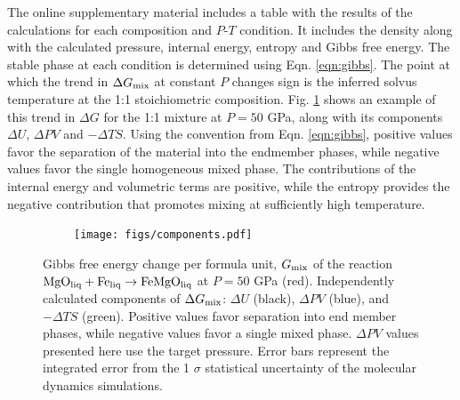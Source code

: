 The online supplementary material includes a table with the results of the calculations
for each composition and $P$-$T$ condition. It includes the density along with the
calculated pressure, internal energy, entropy and Gibbs free energy. The stable phase at
each condition is determined using Eqn. \ref{eqn:gibbs}.  The point at which the trend in
$\Delta G_{\rm mix}$ at constant $P$ changes sign is the inferred solvus temperature at
the 1:1 stoichiometric composition.  Fig.  \ref{fig:components} shows an example of this
trend in $\Delta G$ for the 1:1 mixture at $P=50$ GPa, along with its components $\Delta
U$, $\Delta PV$ and $-\Delta TS$. Using the convention from Eqn. \ref{eqn:gibbs},
positive values favor the separation of the  material into the endmember phases, while
negative values favor the single homogeneous mixed phase. The contributions of the
internal energy and volumetric terms are positive, while the entropy provides the
negative contribution that promotes mixing at sufficiently high temperature. 

\begin{figure}[h!]  
  \centering
    \texttt{[image: figs/components.pdf]}
\caption{Gibbs free energy change per formula unit, $G_{\rm{mix}}$ of the reaction
${ \rm MgO_{liq} + Fe_{liq} } \rightarrow {\rm FeMgO_{liq}}$ at $P=50$ GPa (red).  Independently
calculated components of $\Delta G_{\rm{mix}}$: $\Delta U$ (black), $\Delta PV$ (blue),
and $-\Delta TS$ (green). Positive values favor separation into end member phases,
while negative values favor a single mixed phase. $\Delta PV$ values presented here use
the target pressure. Error bars represent the integrated error from the 1 $\sigma$
statistical uncertainty of the molecular dynamics simulations.}
\label{fig:components}
\end{figure}


